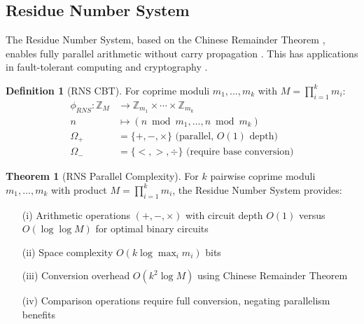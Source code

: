 \documentclass[11pt]{article}
\theoremstyle{definition}
\newtheorem{definition}{Definition}
\newtheorem{theorem}{Theorem}
\begin{document}

\subsection{Residue Number System}

The Residue Number System, based on the Chinese Remainder Theorem \cite{sunzi500}, enables fully parallel arithmetic without carry propagation \cite{szabo1967residue}. This has applications in fault-tolerant computing \cite{watson1967self} and cryptography \cite{bajard1998rns}.

\begin{definition}[RNS CBT]
For coprime moduli $m_1, \ldots, m_k$ with $M = \prod_{i=1}^k m_i$:
\begin{align}
\phi_{RNS}: \mathbb{Z}_M &\to \mathbb{Z}_{m_1} \times \cdots \times \mathbb{Z}_{m_k} \\
n &\mapsto (n \bmod m_1, \ldots, n \bmod m_k) \\
\Omega_+ &= \{+, -, \times\} \text{ (parallel, } O(1) \text{ depth)} \\
\Omega_- &= \{<, >, \div\} \text{ (require base conversion)}
\end{align}
\end{definition}

\begin{theorem}[RNS Parallel Complexity]
\label{thm:rns-parallel}
For $k$ pairwise coprime moduli $m_1, \ldots, m_k$ with product $M = \prod_{i=1}^k m_i$, the Residue Number System provides:
\begin{enumerate}
\item[(i)] Arithmetic operations $(+, -, \times)$ with circuit depth $O(1)$ versus $O(\log \log M)$ for optimal binary circuits
\item[(ii)] Space complexity $O(k \log \max_i m_i)$ bits
\item[(iii)] Conversion overhead $O(k^2 \log M)$ using Chinese Remainder Theorem
\item[(iv)] Comparison operations require full conversion, negating parallelism benefits
\end{enumerate}
\end{theorem}
\end{document}
